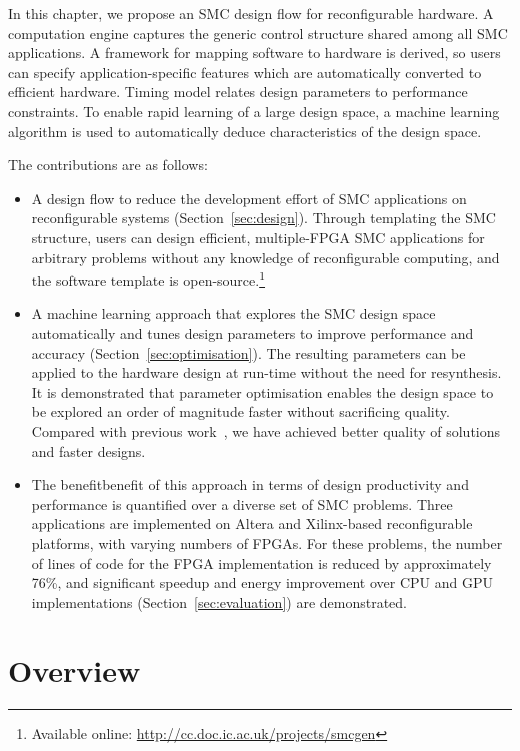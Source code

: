 In this chapter, we propose an SMC design flow for reconfigurable hardware.
A computation engine captures the generic control structure shared among all SMC applications.
A framework for mapping software to hardware is derived, so users can specify application-specific features which are automatically converted to efficient hardware. 
Timing model relates design parameters to performance constraints.
To enable rapid learning of a large design space, a machine learning algorithm is used to automatically deduce characteristics of the design space.

The contributions are as follows:
\begin{itemize}
\item A design flow to reduce the development effort of SMC applications on reconfigurable systems (Section~\ref{sec:design}). Through templating the SMC structure, users can design efficient, multiple-FPGA SMC applications for arbitrary problems without any knowledge of reconfigurable computing, and the software template is open-source.\footnote{Available online: \url{http://cc.doc.ic.ac.uk/projects/smcgen}}
\item A machine learning approach that explores the SMC design space automatically and tunes design parameters to improve performance and accuracy (Section~\ref{sec:optimisation}). The resulting parameters can be applied to the hardware design at run-time without the need for resynthesis.
It is demonstrated that parameter optimisation enables the design space to be explored an order of magnitude faster without sacrificing quality.
Compared with previous work~\cite{chau13a,chau13b}, we have achieved better quality of solutions and faster designs.
\item The benefitbenefit  of this approach in terms of design productivity and performance is quantified over a diverse set of SMC problems.
Three applications are implemented on Altera and Xilinx-based reconfigurable platforms, with varying numbers of FPGAs. For these problems, the number of lines of code for the FPGA implementation is reduced by approximately 76\%, and 
significant speedup and energy improvement over CPU and GPU implementations (Section~\ref{sec:evaluation}) are demonstrated.
\end{itemize}


\section{Overview}
\label{sec:overview}

